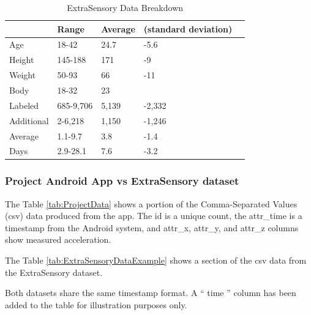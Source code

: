 \documentclass{UoNMCHA}
\newcommand{\inlineQuote}[1]{`` #1 ''}
\newcommand{\tref}[1] {Table \ref{#1}}
\numberwithin{equation}{section}
\begin{document}
\begin{table}[h]
    \begin{center}  
        \caption{ExtraSensory Data Breakdown \cite{Vaizman2017}}\label{tab:ExtraSensoryDataBreakdown}
        \begin{tabular}{lllll}
            \hline\hline 
                       & Range     & Average & (standard deviation) &  \\
            \hline 
            Age        & 18-42     & 24.7    & -5.6                 &  \\
            Height     & 145-188   & 171     & -9                   &  \\
            Weight     & 50-93     & 66      & -11                  &  \\
            Body       & 18-32     & 23      &                      &  \\
            Labeled    & 685-9,706 & 5,139   & -2,332               &  \\
            Additional & 2-6,218   & 1,150   & -1,246               &  \\
            Average    & 1.1-9.7   & 3.8     & -1.4                 &  \\
            Days       & 2.9-28.1  & 7.6     & -3.2 \\
            \hline  
            \end{tabular}
    \end{center}
\end{table}

\subsubsection{Project Android App vs ExtraSensory dataset}
The \tref{tab:ProjectData} shows a portion of the Comma-Separated Values (csv) data produced from the app. The id is a unique count, the attr\_time is a timestamp from the Android system, and attr\_x, attr\_y, and attr\_z columns show measured acceleration.

The \tref{tab:ExtraSensoryDataExample} shows a section of the csv data from the ExtraSensory dataset. 

Both datasets share the same timestamp format. A \inlineQuote{time} column has been added to the table for illustration purposes only.
\end{document}
